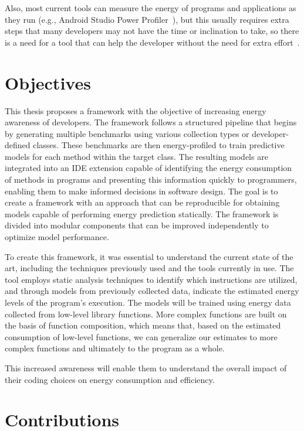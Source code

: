 Also, most current tools can measure the energy of programs and applications as they run (e.g., Android Studio Power Profiler~\cite{android_power_profiler}), but this usually requires extra steps that many developers may not have the time or inclination to take, so there is a need for a tool that can help the developer without the need for extra effort~\cite{10.1145/3154384}.

\section{Objectives}


This thesis proposes a framework with the objective of increasing energy awareness of developers. The framework follows a structured pipeline that begins by generating multiple benchmarks using various collection types or developer-defined classes. These benchmarks are then energy-profiled to train predictive models for each method within the target class.
The resulting models are integrated into an IDE extension capable of identifying the energy consumption of methods in programs and presenting this information quickly to programmers, enabling them to make informed decisions in software design. The goal is to create a framework with an approach that can be reproducible for obtaining models capable of performing energy prediction statically. The framework is divided into modular components that can be improved independently to optimize model performance.


To create this framework, it was essential to understand the current state of the art, including the techniques previously used and the tools currently in use. The tool employs static analysis techniques to identify which instructions are utilized, and through models from previously collected data, indicate the estimated energy levels of the program's execution. The models will be trained using energy data collected from low-level library functions. More complex functions are built on the basis of function composition, which means that, based on the estimated consumption of low-level functions, we can generalize our estimates to more complex functions and ultimately to the program as a whole. 

This increased awareness will enable them to understand the overall impact of their coding choices on energy consumption and efficiency.



\section{Contributions}

